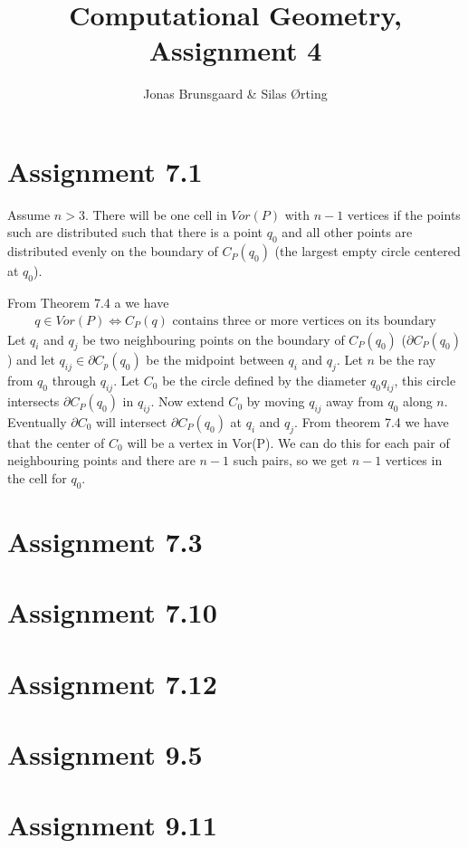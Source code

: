 \documentclass[10pt,a4paper,final,oneside,openany,article,oldfontcommands]{memoir}
\title{Computational Geometry, Assignment 4}
\author{
    Jonas Brunsgaard \& Silas Ørting
}
\begin{document}
\maketitle


\chapter*{Assignment 7.1}
Assume $n > 3$. There will be one cell in $Vor(P)$ with $n-1$ vertices if the points such are distributed such that there is a point $q_0$ and all other points are distributed evenly on the boundary of $C_P(q_0)$ (the largest empty circle centered at $q_0$).

From Theorem 7.4 a we have
\begin{align*}
  q \in Vor(P) \iff C_P(q) \text{ contains three or more vertices on its boundary}
\end{align*}
Let $q_i$ and $q_j$ be two neighbouring points on the boundary of $C_P(q_0)$ ($\partial C_P(q_0)$) and let $q_{ij} \in \partial C_p(q_0)$ be the midpoint between $q_i$ and $q_j$. Let $n$ be the ray from $q_0$ through $q_{ij}$. Let $C_0$ be the circle defined by the diameter $q_0q_{ij}$, this circle intersects $\partial C_P(q_0)$ in $q_{ij}$. Now extend $C_0$ by moving $q_{ij}$ away from $q_0$ along $n$. Eventually $\partial C_0$ will intersect $\partial C_P(q_0)$ at $q_i$ and $q_j$. From theorem 7.4 we have that the center of $C_0$ will be a vertex in Vor(P). We can do this for each pair of neighbouring points and there are $n-1$ such pairs, so we get $n-1$ vertices in the cell for $q_0$.

\chapter*{Assignment 7.3}


\chapter*{Assignment 7.10}


\chapter*{Assignment 7.12}


\chapter*{Assignment 9.5}


\chapter*{Assignment 9.11}
\end{document}
